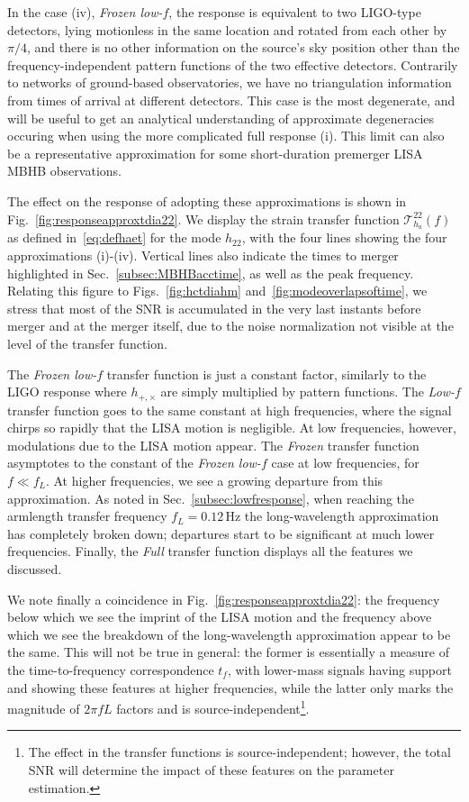 \documentclass[aps,showpacs,twocolumn,prd,superscriptaddress,nofootinbib]{revtex4-1}
\newcommand\calT{{\mathcal{T}}}
\newcommand{\Hz}{\,\mathrm{Hz}}
\newcommand{\tf}{t_{f}}
\begin{document}
In the case (iv), \textit{Frozen low-$f$}, the response is equivalent to two LIGO-type detectors, lying motionless in the same location and rotated from each other by $\pi/4$, and there is no other information on the source's sky position other than the frequency-independent pattern functions of the two effective detectors. Contrarily to networks of ground-based observatories, we have no triangulation information from times of arrival at different detectors. This case is the most degenerate, and will be useful to get an analytical understanding of approximate degeneracies occuring when using the more complicated full response (i). This limit can also be a representative approximation for some short-duration premerger LISA MBHB observations.

The effect on the response of adopting these approximations is shown in Fig.~\ref{fig:responseapproxtdia22}. We display the strain transfer function $\calT_{h_{a}}^{22}(f)$ as defined in~\eqref{eq:defhaet} for the mode $h_{22}$, with the four lines showing the four approximations (i)-(iv). Vertical lines also indicate the times to merger highlighted in Sec.~\ref{subsec:MBHBacctime}, as well as the peak frequency. Relating this figure to Figs.~\ref{fig:hctdiahm} and~\ref{fig:modeoverlapsoftime}, we stress that most of the SNR is accumulated in the very last instants before merger and at the merger itself, due to the noise normalization not visible at the level of the transfer function.

The \textit{Frozen low-$f$} transfer function is just a constant factor, similarly to the LIGO response where $h_{+,\times}$ are simply multiplied by pattern functions. The \textit{Low-$f$} transfer function goes to the same constant at high frequencies, where the signal chirps so rapidly that the LISA motion is negligible. At low frequencies, however, modulations due to the LISA motion appear. The \textit{Frozen} transfer function asymptotes to the constant of the \textit{Frozen low-$f$} case at low frequencies, for $f \ll f_{L}$. At higher frequencies, we see a growing departure from this approximation. As noted in Sec.~\ref{subsec:lowfresponse}, when reaching the armlength transfer frequency $f_{L} = 0.12 \Hz$ the long-wavelength approximation has completely broken down; departures start to be significant at much lower frequencies. Finally, the \textit{Full} transfer function displays all the features we discussed.

We note finally a coincidence in Fig.~\ref{fig:responseapproxtdia22}: the frequency below which we see the imprint of the LISA motion and the frequency above which we see the breakdown of the long-wavelength approximation appear to be the same. This will not be true in general: the former is essentially a measure of the time-to-frequency correspondence $\tf$, with lower-mass signals having support and showing these features at higher frequencies, while the latter only marks the magnitude of $2\pi f L$ factors and is source-independent\footnote{The effect in the transfer functions is source-independent; however, the total SNR will determine the impact of these features on the parameter estimation.}.
\end{document}
